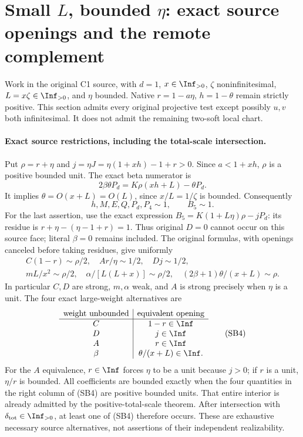 \section[Small L, bounded eta: source openings and the remote complement]{Small $L$, bounded $\eta$: exact source openings and the remote complement}
\label{sec:r8-c1-small-L-bounded-eta}

Work in the original C1 source, with $d=1$, $x\in\Inf_{>0}$,
$\zeta$ noninfinitesimal, $L=x\zeta\in\Inf_{>0}$, and $\eta$
bounded. Native $r=1-a\eta$, $h=1-\theta$ remain strictly positive.
This section admits every original projective test except possibly
$u,v$ both infinitesimal. It does not admit the remaining two-soft
local chart.

\paragraph{Exact source restrictions, including the total-scale intersection.}
Put $\rho=r+\eta$ and $j=\eta J=\eta(1+xh)-1+r>0$.
Since $a<1+xh$, $\rho$ is a positive bounded unit. The exact beta
numerator is
\[
 2\beta\theta P_d=K\rho(xh+L)-\theta P_d.       \tag{SB1}
\]
It implies $\theta=O(x+L)=O(L)$, since $x/L=1/\zeta$ is bounded.
Consequently
\[
 h,M,E,Q,P_d,P_4\sim1,\qquad B_5\sim1.           \tag{SB2}
\]
For the last assertion, use the exact expression
$B_5=K(1+L\eta)\rho-jP_d$: its residue is
$r+\eta-(\eta-1+r)=1$. Thus original $D=0$ cannot occur on
this source face; literal $\beta=0$ remains included.
The original formulas, with openings canceled before taking residues,
give uniformly
\[
\begin{gathered}
 C(1-r)\sim\rho/2,\quad Ar/\eta\sim1/2,
 \quad Dj\sim1/2,\\
 mL/x^2\sim\rho/2,\quad
 \alpha/[L(L+x)]\sim\rho/2,\quad
 (2\beta+1)\theta/(x+L)\sim\rho.
\end{gathered}                                         \tag{SB3}
\]
In particular $C,D$ are strong, $m,\alpha$ weak, and $A$ is strong
precisely when $\eta$ is a unit. The four exact large-weight
alternatives are
\[
\begin{array}{c|c}
\text{weight unbounded}&\text{equivalent opening}\\\hline
C&1-r\in\Inf\\
D&j\in\Inf\\
A&r\in\Inf\\
\beta&\theta/(x+L)\in\Inf.
\end{array}                                                   \tag{SB4}
\]
For the $A$ equivalence, $r\in\Inf$ forces $\eta$ to be a unit
because $j>0$; if $r$ is a unit, $\eta/r$ is bounded.
All coefficients are bounded exactly when the four quantities in
the right column of (SB4) are positive bounded units. That entire
interior is already admitted by the positive-total-scale theorem.
After intersection with $\delta_{\rm tot}\in\Inf_{>0}$, at least
one of (SB4) therefore occurs. These are exhaustive necessary source
alternatives, not assertions of their independent realizability.

